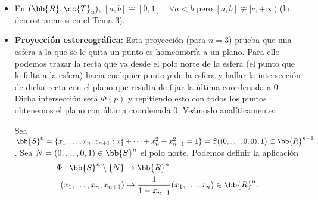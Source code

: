 \begin{ejemplo}
\begin{itemize}
        \item En $(\bb{R}, \cc{T}_u)$, $[a,b]\cong [0,1]$\ \ $\forall a<b$ pero $[a,b]\ncong [c, +\infty)$ (lo demostraremos en el Tema 3).
        
        \item \textbf{Proyección estereográfica:} Esta proyección (para $n=3$) prueba que una esfera a la que se le quita un punto es homeomorfa a un plano. Para ello podemos trazar la recta que va desde el polo norte de la esfera (el punto que le falta a la esfera) hacia cualquier punto $p$ de la esfera y hallar la intersección de dicha recta con el plano que resulta de fijar la última coordenada a 0. Dicha intersección será $\Phi(p)$ y repitiendo esto con todos los puntos obtenemos el plano con última coordenada 0. Veámoslo analíticamente:
        
        Sea $\bb{S}^{n}=\{x_1, \dots, x_n, x_{n+1} : x_1^2 + \dots + x_n^2 + x_{n+1}^2 = 1\} = S((0,\dots,0,0), 1)\subset \bb{R}^{n+1}$. Sea $N=(0,\dots,0,1)\in \bb{S}^n$ el polo norte. Podemos definir la aplicación 
        \begin{align*}
            \Phi : \bb{S}^n\setminus \{N\} &\to \bb{R}^n\\
            (x_1, \dots, x_n, x_{n+1}) &\mapsto \frac{1}{1-x_{n+1}}(x_1, \dots, x_n)\in \bb{R}^n.
        \end{align*}

        \begin{center}
\end{center}
\end{itemize}
\end{ejemplo}
